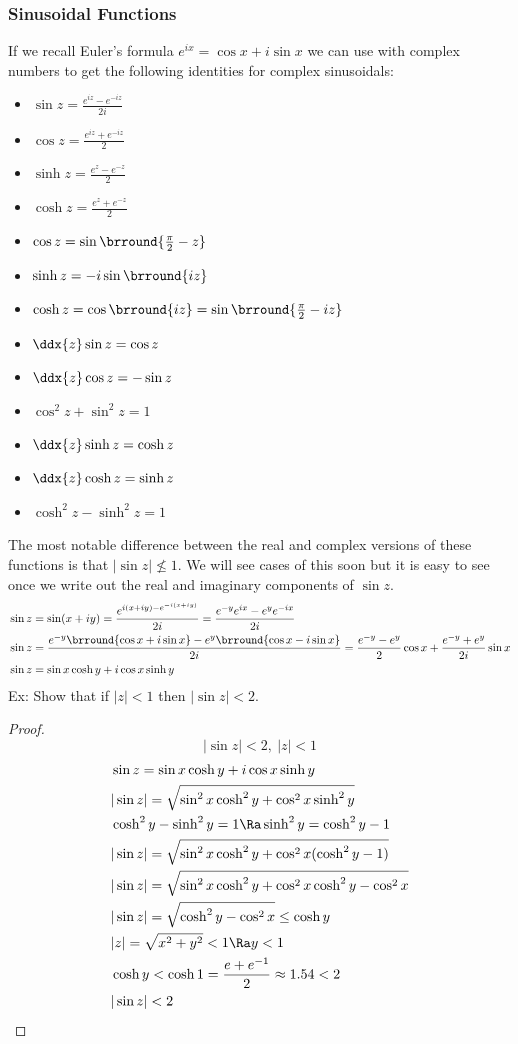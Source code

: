 \subsubsection{Sinusoidal Functions}
If we recall Euler's formula $e^{ix}=\cos x+i\sin x$ we can use with complex numbers to get the following identities for complex sinusoidals:
\begin{itemize}
    \item $\sin z=\frac{e^{iz}-e^{-iz}}{2i}$
    \item $\cos z=\frac{e^{iz}+e^{-iz}}{2}$
    \item $\sinh z=\frac{e^z-e^{-z}}{2}$
    \item $\cosh z=\frac{e^z+e^{-z}}{2}$
    \item $\cos z=\sin\brround{\tfrac{\pi}{2}-z}$
    \item $\sinh z=-i\sin\brround{iz}$
    \item $\cosh z=\cos\brround{iz}=\sin\brround{\tfrac{\pi}{2}-iz}$
    \item $\ddx{z}\sin z=\cos z$
    \item $\ddx{z}\cos z=-\sin z$
    \item $\cos^2z+\sin^2z=1$
    \item $\ddx{z}\sinh z=\cosh z$
    \item $\ddx{z}\cosh z=\sinh z$
    \item $\cosh^2z-\sinh^2z=1$
\end{itemize}
The most notable difference between the real and complex versions of these functions is that $|\sin z|\not\leq1$. We will see cases of this soon but it is easy to see once we write out the real and imaginary components of $\sin z$.
\begin{align*}
    &\sin z=\sin(x+iy)=\frac{e^{i(x+iy)-e^{-i(x+iy)}}}{2i}=\frac{e^{-y}e^{ix}-e^ye^{-ix}}{2i}\\
    &\sin z = \frac{e^{-y}\brround{\cos x+i\sin x}-e^y\brround{\cos x-i\sin x}}{2i}=\frac{e^{-y}-e^y}{2}\cos x+\frac{e^{-y}+e^y}{2i}\sin x\\
    &\sin z = \sin x\cosh y+i\cos x\sinh y
\end{align*}
Ex: Show that if $|z|<1$ then $|\sin z|<2$.
\begin{proof}
    \[ |\sin z|<2,\ |z|<1 \]
    \begin{align*}
        &\sin z=\sin x\cosh y+i\cos x\sinh y\\
        &|\sin z|=\sqrt{\sin^2x\cosh^2y+\cos^2x\sinh^2y}\\
        &\cosh^2y-\sinh^2y=1\Ra \sinh^2y=\cosh^2y-1\\
        &|\sin z|=\sqrt{\sin^2x\cosh^2y+\cos^2x(\cosh^2y-1)}\\
        &|\sin z|=\sqrt{\sin^2x\cosh^2y+\cos^2x\cosh^2y-\cos^2x}\\
        &|\sin z|=\sqrt{\cosh^2y-\cos^2x}\leq \cosh y\\
        &|z|=\sqrt{x^2+y^2}<1\Ra y<1\\
        &\cosh y<\cosh 1=\frac{e+e^{-1}}{2}\approx 1.54<2\\
        &|\sin z|<2
    \end{align*}
\end{proof}

